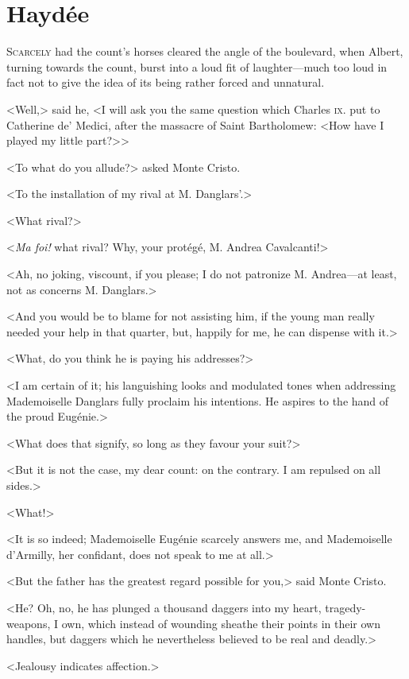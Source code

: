 \chapter{Haydée} 

 \lettrine{S}{carcely} had the count's horses cleared the angle of the boulevard, when Albert, turning towards the count, burst into a loud fit of laughter—much too loud in fact not to give the idea of its being rather forced and unnatural. 

 <Well,> said he, <I will ask you the same question which Charles \textsc{ix.} put to Catherine de' Medici, after the massacre of Saint Bartholomew: <How have I played my little part?>> 

 <To what do you allude?> asked Monte Cristo. 

 <To the installation of my rival at M. Danglars'.> 

 <What rival?> 

 <\textit{Ma foi!} what rival? Why, your protégé, M. Andrea Cavalcanti!> 

 <Ah, no joking, viscount, if you please; I do not patronize M. Andrea—at least, not as concerns M. Danglars.> 

 <And you would be to blame for not assisting him, if the young man really needed your help in that quarter, but, happily for me, he can dispense with it.> 

 <What, do you think he is paying his addresses?> 

 <I am certain of it; his languishing looks and modulated tones when addressing Mademoiselle Danglars fully proclaim his intentions. He aspires to the hand of the proud Eugénie.> 

 <What does that signify, so long as they favour your suit?> 

 <But it is not the case, my dear count: on the contrary. I am repulsed on all sides.> 

 <What!> 

 <It is so indeed; Mademoiselle Eugénie scarcely answers me, and Mademoiselle d'Armilly, her confidant, does not speak to me at all.> 

 <But the father has the greatest regard possible for you,> said Monte Cristo. 

 <He? Oh, no, he has plunged a thousand daggers into my heart, tragedy-weapons, I own, which instead of wounding sheathe their points in their own handles, but daggers which he nevertheless believed to be real and deadly.> 

 <Jealousy indicates affection.> 

